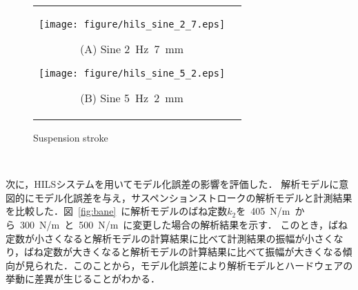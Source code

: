 \documentclass{article_vdlab_sotsuron_youshi}
\begin{document}
\vspace{-1mm}
\begin{figure}[h]
    \begin{tabular}{cc}
      \begin{minipage}{0.5\hsize}
	\centering
	  \texttt{[image: figure/hils\_sine\_2\_7.eps]}
	  \begin{center}
	  \vspace{-4mm}
	  \ (A) Sine 2~Hz~7~mm\
	  \end{center}
	\end{minipage}
       \begin{minipage}{0.5\hsize}
	\centering
	  \texttt{[image: figure/hils\_sine\_5\_2.eps]}
	  \begin{center}
	  \vspace{-4mm}
	  \ (B) Sine 5~Hz~2~mm\
	  \end{center}
      \end{minipage}
    \end{tabular}
    \vspace{-1mm}
    \caption{Suspension stroke}
    \label{fig:hils_step}
\end{figure}
　
\vspace{-6mm}
\par
次に，HILSシステムを用いてモデル化誤差の影響を評価した．
解析モデルに意図的にモデル化誤差を与え，サスペンションストロークの解析モデルと計測結果を比較した．図~\ref{fig:bane}~に解析モデルのばね定数$k_2$を~405~N/m~から~300~N/m~と~500~N/m~に変更した場合の解析結果を示す．
このとき，ばね定数が小さくなると解析モデルの計算結果に比べて計測結果の振幅が小さくなり，ばね定数が大きくなると解析モデルの計算結果に比べて振幅が大きくなる傾向が見られた．このことから，モデル化誤差により解析モデルとハードウェアの挙動に差異が生じることがわかる．
\vspace{-1mm}
\end{document}
